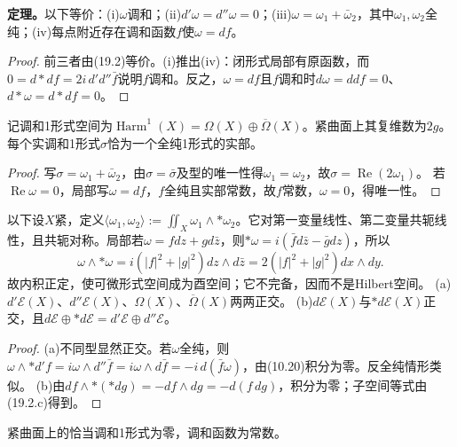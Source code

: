 \textbf{定理。}以下等价：(i)$\omega$调和；(ii)$d'\omega=d''\omega=0$；(iii)$\omega=\omega_1+\bar\omega_2$，其中$\omega_1,\omega_2$全纯；(iv)每点附近存在调和函数$f$使$\omega=df$。
\begin{proof}
前三者由(19.2)等价。(i)推出(iv)：闭形式局部有原函数，而$0=d*df=2i\,d'd''\bar f$说明$f$调和。反之，$\omega=df$且$f$调和时$d\omega=ddf=0$、$d*\omega=d*df=0$。
\end{proof}
记调和1形式空间为$\operatorname{Harm}^1(X)=\Omega(X)\oplus\overline\Omega(X)$。紧曲面上其复维数为$2g$。
每个实调和1形式$\sigma$恰为一个全纯1形式的实部。
\begin{proof}
写$\sigma=\omega_1+\bar\omega_2$，由$\sigma=\bar\sigma$及型的唯一性得$\omega_1=\omega_2$，故$\sigma=\operatorname{Re}(2\omega_1)$。
若$\operatorname{Re}\omega=0$，局部写$\omega=df$，$f$全纯且实部常数，故$f$常数，$\omega=0$，得唯一性。
\end{proof}
以下设$X$紧，定义$\langle\omega_1,\omega_2\rangle:=\iint_X\omega_1\wedge*\omega_2$。它对第一变量线性、第二变量共轭线性，且共轭对称。局部若$\omega=f dz+g d\bar z$，则$*\omega=i(\bar f d\bar z-\bar g dz)$，所以
\[
\omega\wedge*\omega=i(|f|^2+|g|^2)dz\wedge d\bar z=2(|f|^2+|g|^2)dx\wedge dy.
\]
故内积正定，使可微形式空间成为酉空间；它不完备，因而不是Hilbert空间。
(a)$d'\mathcal E(X)$、$d''\mathcal E(X)$、$\Omega(X)$、$\overline\Omega(X)$两两正交。
(b)$d\mathcal E(X)$与$*d\mathcal E(X)$正交，且$d\mathcal E\oplus*d\mathcal E=d'\mathcal E\oplus d''\mathcal E$。
\begin{proof}
(a)不同型显然正交。若$\omega$全纯，则$\omega\wedge*d'f=i\omega\wedge d''\bar f=i\omega\wedge d\bar f=-i\,d(\bar f\omega)$，由(10.20)积分为零。反全纯情形类似。
(b)由$df\wedge*(*dg)=-df\wedge dg=-d(f\,dg)$，积分为零；子空间等式由(19.2.c)得到。
\end{proof}
紧曲面上的恰当调和1形式为零，调和函数为常数。

